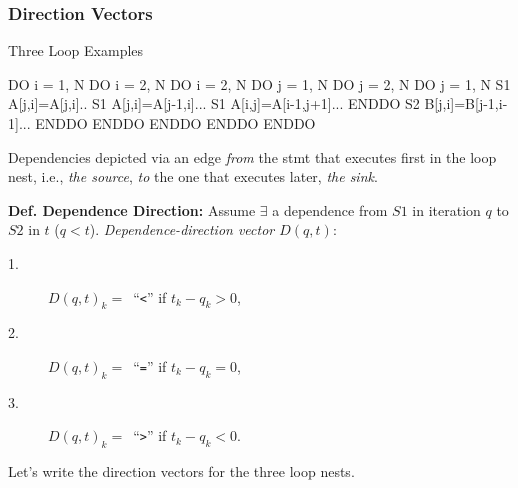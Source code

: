 \documentclass{beamer}
\newcommand{\emp}[1]{\textcolor{DikuRed}{ #1}}
\begin{document}
\begin{frame}[fragile,t]
  \frametitle{Direction Vectors} %

\begin{block}{Three Loop Examples}
\begin{colorcode}
  DO i = 1, N            DO i = 2, N               DO i = 2, N
    DO j = 1, N            DO j = 2, N               DO j = 1, N 
S1    A[j,i]=A[j,i]..  S1   A[j,i]=A[j-1,i]...   S1    A[i,j]=A[i-1,j+1]...
    ENDDO              S2   B[j,i]=B[j-1,i-1]...     ENDDO
  ENDDO                  ENDDO ENDDO               ENDDO
\end{colorcode}
\end{block} 



\smallskip

Dependencies depicted via an edge {\em from} the stmt that executes first
in the loop nest, i.e., {\em the source}, {\em to} the one that executes later, {\em the sink}.

\smallskip

{\bf Def. Dependence Direction:} Assume $\exists$ a dependence from $S1$ in iteration $q$
to $S2$ in $t$ ($q<t$). \emp{\em Dependence-direction vector $D(q,t)$}:
\begin{description}
    \item[1.] $D(q,t)_k = $~``{\tt{}<}'' if $t_k - q_k > 0$,
    \item[2.] $D(q,t)_k = $~``{\tt{}=}'' if $t_k - q_k = 0$,
    \item[3.] $D(q,t)_k = $~``{\tt{}>}'' if $t_k - q_k < 0$.
\end{description}

\bigskip
\alert{Let's write the direction vectors for the three loop nests.}
\end{frame}
\end{document}
